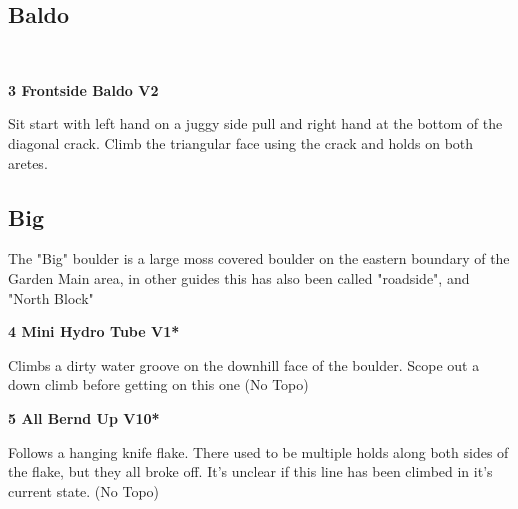 \begin{multicols}{2}
\begin{minipage}{\columnwidth}
			\subsection*{Baldo}\label{bf:Baldo}
			\
			
			\end{minipage}
			

					\begin{minipage}{\linewidth}	
					\label{rt:Frontside Baldo}
\colorbox{green!20}{
\parbox{0.95\textwidth}{
\textbf{
3 Frontside Baldo V2    
}
}
}

					\begin{adjustwidth}{0.5cm}{}				
					Sit start with left hand on a juggy side pull and right hand at the bottom of the diagonal crack. Climb the triangular face using the crack and holds on both aretes.
					\end{adjustwidth}
					\end{minipage}
			\begin{minipage}{\columnwidth}
			\subsection*{Big}\label{bf:Big}
			The "Big" boulder is a large moss covered boulder on the eastern boundary of the Garden Main area, in other guides this has also been called "roadside", and "North Block"
			
			\end{minipage}
			
					\begin{minipage}{\linewidth}	
					\label{rt:Mini Hydro Tube}
\colorbox{green!20}{
\parbox{0.95\textwidth}{
\textbf{
4 Mini Hydro Tube V1*  \warn 
}
}
}

					\begin{adjustwidth}{0.5cm}{}				
					Climbs a dirty water groove on the downhill face of the boulder. Scope out a down climb before getting on this one
						\newline (No Topo) 
					\end{adjustwidth}
					\end{minipage}
					\begin{minipage}{\linewidth}	
					\label{rt:All Bernd Up}
\colorbox{red!20}{
\parbox{0.95\textwidth}{
\textbf{
5 All Bernd Up V10*  
}
}
}

					\begin{adjustwidth}{0.5cm}{}				
					Follows a hanging knife flake. There used to be multiple holds along both sides of the flake, but they all broke off. It's unclear if this line has been climbed in it's current state.
						\newline (No Topo) 
					\end{adjustwidth}
					\end{minipage}
			\begin{minipage}{\columnwidth}

\end{minipage}
\end{multicols}

